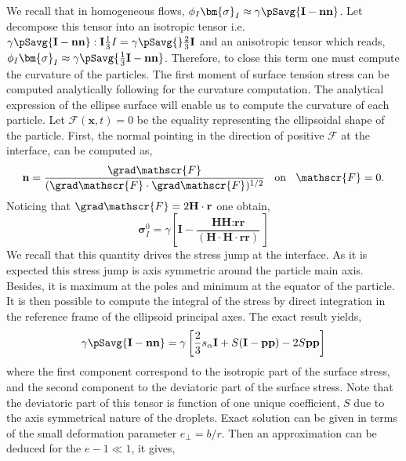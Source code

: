 We recall that in homogeneous flows, $\phi_I \bm{\sigma}_I \approx \gamma\pSavg{\textbf{I}-\textbf{nn}}$. 
Let decompose this tensor into an isotropic tensor i.e. $\gamma\pSavg{\textbf{I}-\textbf{nn}} : \textbf{I} \frac{1}{3}I = \gamma\pSavg{} \frac{2}{3} \textbf{I}$ and an anisotropic tensor which reads, $\phi_I \bm{\sigma}_I \approx \gamma\pSavg{\frac{1}{3}\textbf{I}-\textbf{nn}}$.  
Therefore, to close this term one must compute the curvature of the particles. 
The first moment of surface tension stress can be computed analytically following \citep{nadim1996concise} for the curvature computation.
The analytical expression of the ellipse surface will enable us to compute the curvature of each particle.  
Let $\mathscr{F}(\textbf{x},t) = 0$ be the equality representing the ellipsoidal shape of the particle. 
First, the normal pointing in the direction of positive $\mathscr{F}$ at the interface, can be computed as, 
\begin{equation*}
    \textbf{n} = \frac{\grad \mathscr{F}}{(\grad \mathscr{F}\cdot \grad \mathscr{F})^{1/2}} \;\;\text{ on }\;\; \mathscr{F} = 0.  
\end{equation*}
Noticing that $\grad \mathscr{F} = 2\textbf{H}\cdot \textbf{r}$ one obtain, 
\begin{equation*}
    \bm{\sigma}_I^0 =\gamma\left[
    \textbf{I} - \frac{ \textbf{HH} :  \textbf{rr}}{ (\textbf{H}\cdot  \textbf{H}\cdot \textbf{rr})} \right]
\end{equation*}
We recall that this quantity drives the stress jump at the interface. 
As it is expected this stress jump is axis symmetric around the particle main axis. 
Besides, it is maximum at the poles and minimum at the equator of the particle. 
It is then possible to compute the integral of the stress by direct integration in the reference frame of the ellipsoid principal axes. 
The exact result yields, 
\begin{equation*}
    \gamma\pSavg{\textbf{I}-\textbf{nn}}
    = \gamma \left[
        \frac{2}{3} s_\alpha \textbf{I}
        + S (\textbf{I}-\textbf{pp}) -2S\textbf{pp}
        \right]
\end{equation*}
where the first component correspond to the isotropic part of the surface stress, and the second component to the deviatoric part of the surface stress. 
Note that the deviatoric part of this tensor is function of one unique coefficient, $S$ due to the axis symmetrical nature of the droplets. 
Exact solution can be given in terms of the small deformation parameter $e_\bot = b/r$. 
Then an approximation can be deduced for the $e -1 \ll 1$, it gives,
